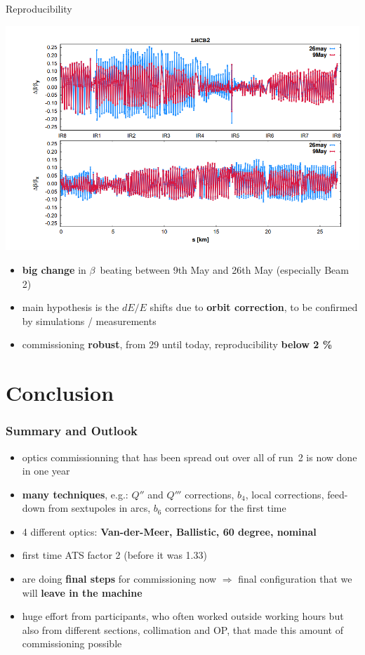 \documentclass[4pt,usenames,dvipsnames,aspectratio=169,table]{beamer}
\newcommand{\highl}[1]{\textbf{#1}}
\begin{document}
\begin{frame}{Reproducibility}


    \includegraphics[width=0.5\linewidth]{images/reproducibility/B2_26May_9May.png}

\begin{itemize}
    \item \highl{big change} in $\beta$~beating between 9th May and 26th May (especially Beam 2)
    \item main hypothesis is the $dE/E$ shifts due to  \highl{orbit correction},
    to be confirmed by simulations / measurements
    \item  commissioning \highl{robust}, from 29 until today, reproducibility \highl{below 2 \%}
\end{itemize}

    
\end{frame}

\section{Conclusion}

\begin{frame}
    \frametitle{Summary and Outlook}

    \begin{itemize}
        \item optics commissionning that has been spread out over all of run~2 is now done in one year
         \item \highl{many techniques}, e.g.: $Q''$ and $Q'''$ corrections, $b_4$,
        local corrections,
        feed-down from sextupoles in arcs, 
        $b_6$ corrections for the first time
        \item 4 different optics: \highl{Van-der-Meer, Ballistic, 60 degree, nominal}
        \item first time ATS factor 2 (before it was 1.33)
        \item are doing \highl{final steps} for commissioning now
        $\Rightarrow$ final configuration that we will \highl{leave in the machine}
        
        \item huge effort from participants, who often worked outside working hours but also from different sections, collimation and OP, that made this amount of commissioning possible
    \end{itemize}

\end{frame}
\end{document}
